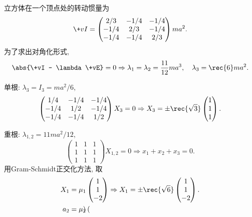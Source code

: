 \documentclass[../LectureNotes.tex]{subfiles}
\begin{document}
\begin{sample}
    \begin{ex}
        立方体在一个顶点处的转动惯量为
        \[ \+vI = \begin{pmatrix}
            2/3 & -1/4 & -1/4 \\
            -1/4 & 2/3 & -1/4 \\
            -1/4 & -1/4 & 2/3
        \end{pmatrix}ma^2. \]
        为了求出对角化形式,
        \[ \abs{\+vI - \lambda\+vE} = 0 \Rightarrow \lambda_1 = \lambda_2 = \frac{11}{12}ma^3,\quad \lambda_3 = \rec{6}ma^2. \]
        \begin{cenum}
            \item 单根: $\lambda_3 = I_3 = ma^2/6$,
            \[ \begin{pmatrix}
                1/4 & -1/4 & -1/4 \\
                -1/4 & 1/2 & -1/4 \\
                -1/4 & -1/4 & 1/2
            \end{pmatrix}X_3 = 0 \Rightarrow X_3 = \pm\rec{\sqrt{3}} \begin{pmatrix}
                1 \\ 1 \\ 1
            \end{pmatrix}. \]
            \item 重根: $\lambda_{1,2} = 11ma^2/12$,
            \[ \begin{pmatrix}
                1 & 1 & 1 \\
                1 & 1 & 1 \\
                1 & 1 & 1
            \end{pmatrix}X_{1,2} = 0\Rightarrow x_1 + x_2 + x_3 = 0. \]
            用Gram-Schmidt正交化方法, 取
            \begin{align*}
                X_1 &= \mu_1 \begin{pmatrix}
                    1 \\ 1 \\ -2
                \end{pmatrix} \Rightarrow X_1 = \pm\rec{\sqrt{6}} \begin{pmatrix}
                    1 \\ 1 \\ -2
                \end{pmatrix}. \\
                a_2 &= \mu_2 \begin{pmatrix}

\end{pmatrix}
\end{align*}
\end{cenum}
\end{ex}
\end{sample}
\end{document}
